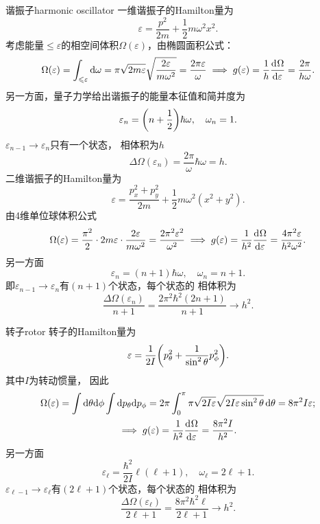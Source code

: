 \begin{example}{谐振子}{harmonic oscillator}
	一维谐振子的Hamilton量为
	\[
		\varepsilon = \frac{p^2}{2m} + \frac12m\omega^2x^2.
	\]
	考虑能量$\leq \varepsilon$的相空间体积$\Omega(\varepsilon)$，由椭圆面积公式：
	\begin{equation}
		\Omega(\varepsilon) = \int_{\leqslant\varepsilon}\mathop{}\!\mathrm{d}\omega = \pi\sqrt{2m\varepsilon}\sqrt{\frac{2\varepsilon}{m\omega^2}} = \frac{2\pi\varepsilon}\omega
		\implies
		g(\varepsilon) = \frac1h\frac{\mathop{}\!\mathrm{d}^{}\Omega}{\mathrm{d}{\varepsilon}^{}} = \frac{2\pi}{h\omega}.
	\end{equation}
	另一方面，量子力学给出谐振子的能量本征值和简并度为
	\[
		\varepsilon_n = \biggl(n + \frac12\biggr)\hbar\omega,\quad\omega_n = 1.
	\]
	$\varepsilon_{n-1} \to \varepsilon_n$只有一个状态，
	相体积为$h$
	\[
		\Delta\Omega(\varepsilon_n) = \frac{2\pi}\omega\hbar\omega = h.
	\]
	\tcblower
	二维谐振子的Hamilton量为
	\[
		\varepsilon = \frac{p_x^2 + p_y^2}{2m} + \frac12m\omega^2(x^2 + y^2).
	\]
	由4维单位球体积公式
	\begin{equation}
		\Omega(\varepsilon) = \frac{\pi^2}2 \cdot 2m\varepsilon \cdot \frac{2\varepsilon}{m\omega^2} = \frac{2\pi^2\varepsilon^2}{\omega^2}
		\implies
		g(\varepsilon) = \frac1{h^2 }\frac{\mathop{}\!\mathrm{d}^{}\Omega}{\mathrm{d}{\varepsilon}^{}} = \frac{4\pi^2\varepsilon}{h^2\omega^2}.
	\end{equation}
	另一方面
	\[
		\varepsilon_n = (n + 1)\hbar\omega,\quad\omega_n = n + 1.
	\]
	即$\varepsilon_{n-1} \to \varepsilon_n$有$(n + 1)$个状态，每个状态的
	相体积为
	\[
		\frac{\Delta\Omega(\varepsilon_n)}{n + 1} = \frac{2\pi^2\hbar^2(2n + 1)}{n + 1} \to h^2.
	\]
\end{example}
\begin{example}{转子}{rotor}
	转子的Hamilton量为
	\[
		\varepsilon = \frac1{2I}\biggl(p_\theta^2 + \frac1{\sin^2\theta}p_\phi^2\biggr).
	\]
	其中$I$为转动惯量，
	因此
	\begin{gather}\notag
		\Omega(\varepsilon) = \int\mathop{}\!\mathrm{d}\theta\mathrm{d}\phi\int\mathop{}\!\mathrm{d} p_\theta\mathrm{d} p_\phi = 2\pi\int_0^\pi\pi\sqrt{2I\varepsilon}\sqrt{2I\varepsilon\sin^2\theta}\mathop{}\!\mathrm{d}\theta = 8\pi^2I\varepsilon;\\
		\implies
		g(\varepsilon) = \frac1{h^2}\frac{\mathop{}\!\mathrm{d}^{}\Omega}{\mathrm{d}{\varepsilon}^{}} = \frac{8\pi^2I}{h^2}.
	\end{gather}
	另一方面
	\[
		\varepsilon_\ell = \frac{\hbar^2}{2I}\ell(\ell + 1),\quad\omega_\ell = 2\ell + 1.
	\]
	$\varepsilon_{\ell-1} \to \varepsilon_\ell$有$(2\ell + 1)$个状态，每个状态的
	相体积为
	\[
		\frac{\Delta\Omega(\varepsilon_\ell)}{2\ell + 1} = \frac{8\pi^2\hbar^2\ell}{2\ell + 1} \to h^2.
	\]
\end{example}
